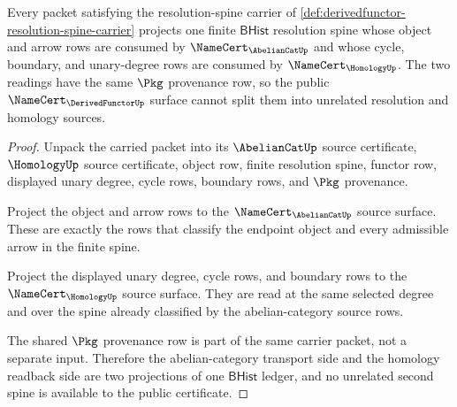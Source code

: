 \begin{theorem}\label{thm:derivedfunctor-source-coupled-homology-readback}
Every packet satisfying the resolution-spine carrier of \autoref{def:derivedfunctor-resolution-spine-carrier} projects one finite $\mathsf{BHist}$ resolution spine whose object and arrow rows are consumed by $\NameCert_{\AbelianCatUp}$ and whose cycle, boundary, and unary-degree rows are consumed by $\NameCert_{\HomologyUp}$. The two readings have the same $\Pkg$ provenance row, so the public $\NameCert_{\DerivedFunctorUp}$ surface cannot split them into unrelated resolution and homology sources.
\end{theorem}
\begin{proof}
Unpack the carried packet into its $\AbelianCatUp$ source certificate, $\HomologyUp$ source certificate, object row, finite resolution spine, functor row, displayed unary degree, cycle rows, boundary rows, and $\Pkg$ provenance.

Project the object and arrow rows to the $\NameCert_{\AbelianCatUp}$ source surface. These are exactly the rows that classify the endpoint object and every admissible arrow in the finite spine.

Project the displayed unary degree, cycle rows, and boundary rows to the $\NameCert_{\HomologyUp}$ source surface. They are read at the same selected degree and over the spine already classified by the abelian-category source rows.

The shared $\Pkg$ provenance row is part of the same carrier packet, not a separate input. Therefore the abelian-category transport side and the homology readback side are two projections of one $\mathsf{BHist}$ ledger, and no unrelated second spine is available to the public certificate.
\end{proof}

